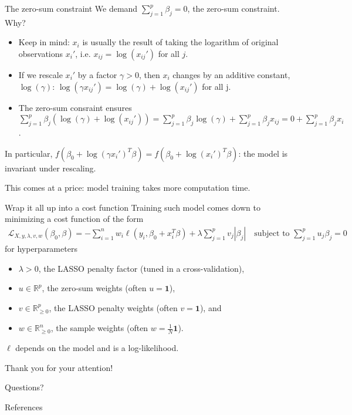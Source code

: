 \documentclass[10pt, aspectratio=169]{beamer}
\begin{document}
\begin{frame}{The zero-sum constraint}
  We demand $\sum_{j=1}^p \beta_j = 0$, the zero-sum constraint. Why?

  \begin{itemize}
    \item Keep in mind: $x_i$ is usually the result of taking the logarithm of original 
      observations $x_i'$, i.e. $x_{ij} = \log(x_{ij}')$ for all $j$.
    \item If we rescale $x_i'$ by a factor $\gamma > 0$, then $x_i$ changes by an additive 
      constant, $\log(\gamma)$: $\log(\gamma x_{ij}') = \log(\gamma) + \log(x_{ij}')$ for all j.
    \item The zero-sum consraint ensures $\sum_{j=1}^p \beta_j (\log(\gamma) + \log(x_{ij}')) = 
      \sum_{j=1}^p \beta_j \log(\gamma) + \sum_{j=1}^p \beta_j x_{ij} = 0 + \sum_{j=1}^p 
      \beta_j x_i$. 
  \end{itemize}
  
  In particular, $f(\beta_0 + \log(\gamma x_i')^T \beta) = f(\beta_0 + \log(x_i')^T \beta)$: the 
  model is \alert{invariant under rescaling}.

  This comes at a price: model training takes more computation time.
\end{frame}

\begin{frame}{Wrap it all up into a cost function}
  Training such model comes down to minimizing a cost function of the form 
  \begin{align}
    \mathcal{L}_{X, y, \lambda, v, w}(\beta_0, \beta) = -\sum_{i=1}^n w_i \ell(y_i, \beta_0 + x_i^T \beta) + 
    \lambda \sum_{j=1}^p v_j |\beta_j| \quad \text{subject to } \sum_{j=1}^p u_j \beta_j = 0
  \end{align}
  for hyperparameters 
  \begin{itemize}
    \item $\lambda > 0$, the LASSO penalty factor (tuned in a cross-validation),
    \item $u \in \mathbb{R}^p$, the zero-sum weights (often $u = \mathbf{1}$),
    \item $v \in \mathbb{R}^p_{\geq 0}$, the LASSO penalty weights (often $v = \mathbf{1}$), and
    \item $w \in \mathbb{R}^n_{\geq 0}$, the sample weights (often $w = \frac{1}{N} \mathbf{1}$).
  \end{itemize}

  $\ell$ depends on the model and is a log-likelihood.
\end{frame}

\begin{frame}[standout]
  Thank you for your attention! \par Questions?
\end{frame}

\appendix

\begin{frame}[allowframebreaks]{References}
  \printbibliography
\end{frame}
\end{document}
